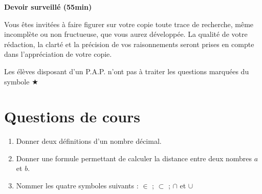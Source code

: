 \documentclass[oneside,12pt]{exam}          %
\begin{document}
\footer{}{\footnotesize \etablissement}{}

\hrulefill\raisebox{-1.9pt}{\quad\decofourleft~\decosix~\decofourright \quad}\hrulefill

\begin{center}
	\textbf{\large Devoir surveillé  (55min)}
\end{center}
\vspace{-5pt}
Vous êtes invité\textperiodcentered e\textperiodcentered s à faire figurer sur votre copie toute trace de recherche, même incomplète ou non fructueuse, que vous aurez développée. La qualité de votre rédaction, la clarté et la précision de vos raisonnements seront prises en compte dans l’appréciation de votre copie.

Les élèves disposant d'un P.A.P. n'ont pas à traiter les questions marquées du symbole $\bigstar$

\vspace{-8pt}\hrulefill\raisebox{-1.9pt}{\quad\decofourleft~\decosix~\decofourright \quad}\hrulefill
\vspace{5pt}



\section{Questions de cours}
\begin{enumerate}
	\item Donner deux définitions d'un nombre décimal.
	\item Donner une formule permettant de calculer la distance entre deux nombres $a$ et $b$.
	\item Nommer les quatre symboles suivants : $\in$ ; $\subset$ ; $\cap$ et $\cup$
\end{enumerate}
\end{document}

